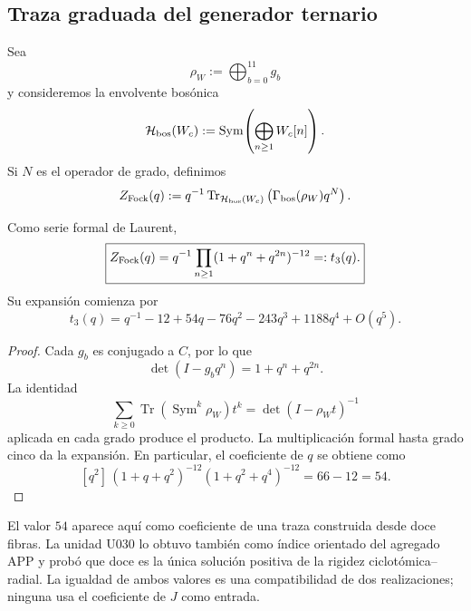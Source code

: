 \subsection{Traza graduada del generador ternario}

Sea
\[
 \rho_W:=\bigoplus_{b=0}^{11}g_b
\]
y consideremos la envolvente bosónica
\begin{equation}
 \mathcal H_{\rm bos}(W_c)
 :=
 \operatorname{Sym}\!\left(
 \bigoplus_{n\ge1}W_c[n]
 \right).
 \label{p12-83-c20-s8:eq:fock-bosonico-doce-fibras-u031}
\end{equation}
Si \(N\) es el operador de grado, definimos
\begin{equation}
 Z_{\rm Fock}(q)
 :=
 q^{-1}\operatorname{Tr}_{\mathcal H_{\rm bos}(W_c)}
 \left(\Gamma_{\rm bos}(\rho_W)q^N\right).
 \label{p12-83-c20-s8:eq:traza-graduada-fock-u031}
\end{equation}

\begin{proposition}
\label{p12-83-c20-s8:prop:producto-tres-doce-fibras-u031}
Como serie formal de Laurent,
\begin{equation}
 \boxed{
 Z_{\rm Fock}(q)
 =q^{-1}\prod_{n\ge1}(1+q^n+q^{2n})^{-12}
 =:t_3(q).}
 \label{p12-83-c20-s8:eq:t3-producto-u031}
\end{equation}
Su expansión comienza por
\begin{equation}
 t_3(q)
 =q^{-1}-12+54q-76q^2-243q^3+1188q^4+O(q^5).
 \label{p12-83-c20-s8:eq:t3-expansion-u031}
\end{equation}
\end{proposition}

\begin{proof}
Cada \(g_b\) es conjugado a \(C\), por lo que
\[
 \det(I-g_bq^n)=1+q^n+q^{2n}.
\]
La identidad
\[
 \sum_{k\ge0}
 \operatorname{Tr}(\operatorname{Sym}^k\rho_W)t^k
 =\det(I-\rho_Wt)^{-1}
\]
aplicada en cada grado produce el producto. La multiplicación formal hasta
grado cinco da la expansión. En particular, el coeficiente de \(q\) se
obtiene como
\[
 [q^2]\,
 (1+q+q^2)^{-12}(1+q^2+q^4)^{-12}
 =66-12=54.
\]
\end{proof}

El valor \(54\) aparece aquí como coeficiente de una traza construida desde
doce fibras. La unidad U030 lo obtuvo también como índice orientado del
agregado APP y probó que doce es la única solución positiva de la rigidez
ciclotómica--radial. La igualdad de ambos valores es una compatibilidad de
dos realizaciones; ninguna usa el coeficiente de \(J\) como entrada.

